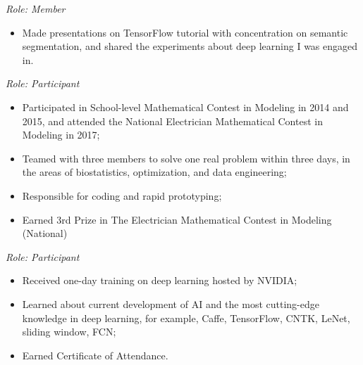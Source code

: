 \documentclass{resume}
\begin{document}
\textit{Role: Member}{}
\begin{itemize}
 \item Made presentations on TensorFlow tutorial with concentration on semantic
   segmentation, and
shared the experiments about deep learning I was engaged in.

\end{itemize}

\textit{Role: Participant}{}
\begin{itemize}
 \item Participated in School-level Mathematical Contest in Modeling in 2014 and 2015, and attended
the National Electrician Mathematical Contest in Modeling in 2017;
\item Teamed with three members to solve one real problem within three days, in
  the areas of biostatistics,
optimization, and data engineering;
\item Responsible for coding and rapid prototyping;
\item Earned 3rd Prize in The Electrician Mathematical Contest in Modeling (National)

\end{itemize}

\textit{Role: Participant}{}
\begin{itemize}
 \item Received one-day training on deep learning hosted by NVIDIA;
\item Learned about current development of AI and the most cutting-edge knowledge in deep
learning, for example, Caffe, TensorFlow, CNTK, LeNet, sliding window, FCN;
\item Earned Certificate of Attendance.
\end{itemize}


\end{document}
